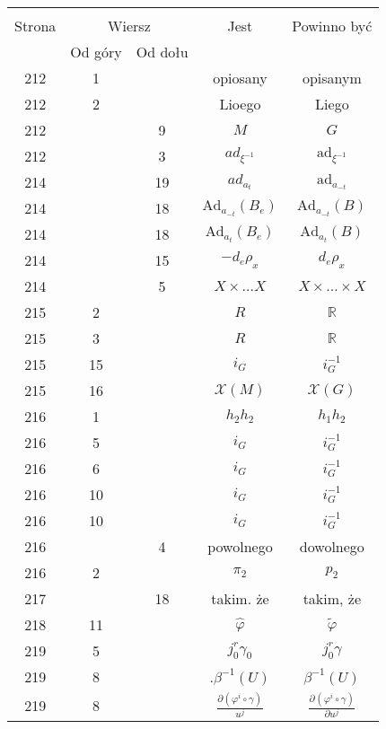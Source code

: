 \documentclass[a4paper,11pt]{article}
\newcommand{\fr}{\frac}
\newcommand{\mb}{\mathbb}
\newcommand{\mc}{\mathcal}
\newcommand{\mr}{\mathrm}
\newcommand{\pr}{\partial}
\newcommand{\ld}{\ldots}
\newcommand{\ti}{\times}
\newcommand{\ad}{\mr{ad}}
\newcommand{\Ad}{\mr{Ad}}
\newcommand{\be}{\beta}
\newcommand{\ga}{\gamma}
\newcommand{\vp}{\varphi}
\newcommand{\R}{\mb{R}}
\newcommand{\X}{\mc{X}}
\newcommand{\wt}{\widetilde}
\newcommand{\wh}{\widehat}
\newcommand{\pd}[3]{\frac{ \pr^{ #1 } { #2 } }{ \pr { #3 }^{ #1 } }}
\begin{document}
\begin{center}
  \begin{tabular}{|c|c|c|c|c|}
    \hline
    & \multicolumn{2}{c|}{} & & \\
    Strona & \multicolumn{2}{c|}{Wiersz}& Jest & Powinno być \\ \cline{2-3}
    & Od góry & Od dołu &  &  \\ \hline
    212 & 1 & & opiosany & opisanym \\
    212 & 2 & & Lioego & Liego \\
    212 & &  9 & $M$ & $G$ \\
    212 & &  3 & $ad_{ \xi^{ -1 } }$ & $\ad_{ \xi^{ -1 } }$ \\
    214 & & 19 & $ad_{ a_{ t } }$ & $\ad_{ a_{ -t } }$ \\
    214 & & 18 & $\Ad_{ a_{ -t } }( B_{ e } )$ & $\Ad_{ a_{ -t } }( B )$ \\
    214 & & 18 & $\Ad_{ a_{ t } }( B_{ e } )$ & $\Ad_{ a_{ t } }( B )$ \\
    214 & & 15 & $-d_{ e }\rho_{ x }$ & $d_{ e }\rho_{ x }$ \\
    214 & &  5 & $X \ti \ld X$ & $X \ti \ld \ti X$ \\
    215 &  2 & & $R$ & $\R$ \\
    215 &  3 & & $R$ & $\R$ \\
    215 & 15 & & $i_{ G }$ & $i_{ G }^{ -1 }$ \\
    215 & 16 & & $\X( M )$ & $\X( G )$ \\
    216 &  1 & & $h_{ 2 }h_{ 2 }$ & $h_{ 1 }h_{ 2 }$ \\
    216 &  5 & & $i_{ G }$ & $i^{ -1 }_{ G }$ \\
    216 &  6 & & $i_{ G }$ & $i^{ -1 }_{ G }$ \\
    216 & 10 & & $i_{ G }$ & $i^{ -1 }_{ G }$ \\
    216 & 10 & & $i_{ G }$ & $i^{ -1 }_{ G }$ \\
    216 & & 4 & powolnego & dowolnego \\
    216 & 2 & & $\pi_{ 2 }$ & $p_{ 2 }$ \\
    217 & & 18 & takim. że & takim, że \\
    218 & 11 & & $\wh{ \vp }$ & $\wt{ \vp }$ \\
    219 &  5 & & $j^{ r }_{ 0 } \ga_{ 0 }$ & $j^{ r }_{ 0 } \ga$ \\
    219 &  8 & & $.\be^{ -1 }( U )$ & $\be^{ -1 }( U )$ \\
    219 &  8 & & $\fr{ \pr ( \vp^{ i } \circ \ga ) }{ u^{ j } }$
           & $\pd{}{ ( { \vp^{ i } } \circ \ga ) }{ { u^{ j } } }$ \\

\end{tabular}
\end{center}
\end{document}
